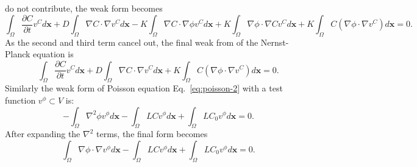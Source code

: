 do not contribute, the weak form becomes
\begin{equation}
  \int_{\Omega}\frac{\partial C}{\partial t}v^C d\mathbf{x}+
  D\int_{\Omega}\nabla C \cdot \nabla v^C d\mathbf{x}-
  K\int_{\Omega}\nabla C \cdot \nabla \phi v^C d\mathbf{x}+
  K\int_{\Omega}\nabla \phi \cdot \nabla C v^C d\mathbf{x}+
  K\int_{\Omega} C \left(\nabla\phi\cdot\nabla v^C\right) d\mathbf{x}=0.
  \label{eq:nernst-planck-weak3}
\end{equation}
As the second and third term cancel out, the final weak from of 
the Nernst-Planck equation is
\begin{equation}
  \int_{\Omega}\frac{\partial C}{\partial t}v^C d\mathbf{x}+
  D\int_{\Omega}\nabla C \cdot \nabla v^C d\mathbf{x}+
  K\int_{\Omega} C \left(\nabla\phi\cdot\nabla v^C\right) d\mathbf{x}=0.
  \label{eq:nernst-planck-weak-final}
\end{equation}
Similarly the weak form of Poisson equation Eq.~\ref{eq:poisson-2}
with a test function $v^\phi\subset V$ is:
\begin{equation}
  -\int_{\Omega}\nabla^2\phi v^\phi d\mathbf{x}-\int_{\Omega}LCv^\phi d\mathbf{x}+
  \int_{\Omega}LC_{0}v^\phi d\mathbf{x}=0.
  \label{eq:poisson-weak1}
\end{equation}
After expanding the $\nabla^2$ terms, the final form becomes
\begin{equation}
  \int_{\Omega}\nabla\phi\cdot\nabla v^\phi d\mathbf{x}-\int_{\Omega}LCv^\phi d\mathbf{x}+
  \int_{\Omega}LC_{0}v^\phi d\mathbf{x}=0.
  \label{eq:poisson-weak-final}
\end{equation}



